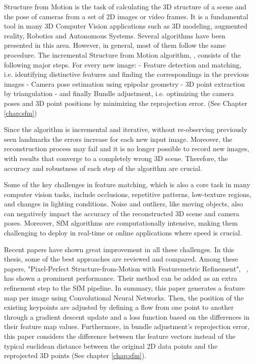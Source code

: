 \documentclass[11pt]{article}
\begin{document}
    Structure from Motion is the task of calculating the 3D structure of a scene and the pose of cameras from
    a set of 2D images or video frames.
    It is a fundamental tool in many 3D Computer Vision applications such as 3D modeling, augmented reality,
    Robotics and Autonomous Systems.
    Several algorithms have been presented in this area. However, in general, most of them follow the same procedure.
    The incremental Structure from Motion algorithm, \cite{schoenberger2016sfm}, consists of the following major steps.
    For every new image: - Feature detection and matching, i.e. identifying distinctive features and finding the
    correspondings in the previous images - Camera pose estimation using epipolar geometry - 3D point extraction
    by triangulation - and finally Bundle adjustment, i.e. optimizing the camera poses and 3D point positions by
    minimizing the reprojection error. (See Chapter \ref{chap:sfm})

    Since the algorithm is incremental and iterative, without re-observing previously seen landmarks the errors increase for each new input image. Moreover, the reconstruction process may fail and it is no longer possible to record new images, with results that converge to a completely wrong 3D scene. Therefore, the accuracy and robustness of each step of the algorithm are crucial.

    Some of the key challenges in feature matching, which is also a core task in many computer vision tasks,
    include occlusions, repetitive patterns, low-texture regions, and changes in lighting conditions.
    Noise and outliers, like moving objects, also can negatively impact the accuracy
    of the reconstructed 3D scene and camera poses. Moreover, SfM algorithms are computationally intensive,
    making them challenging to deploy in real-time or online applications where speed is crucial.

    Recent papers have shown great improvement in all these challenges. In this thesis, some of the best approaches are
    reviewed and compared. Among these papers, "Pixel-Perfect Structure-from-Motion with Featuremetric Refinement",
    ~\cite{lindenberger2021pixsfm}, has shown a prominent performance. Their method can be added as an extra refinement
    step to the SfM pipeline. In summary, this paper generates
    a feature map per image using Convolutional Neural Networks. Then, the position of the existing keypoints are adjusted by defining a flow
    from one point to another through a gradient descent update and a loss function based on the differences in their
    feature map values.
    Furthermore, in bundle adjustment's reprojection error, this paper considers the difference between the
    feature vectors instead of the typical euclidean distance between the original 2D data points and the reprojected
    3D points (See chapter \ref{chap:sfm}).
\end{document}
